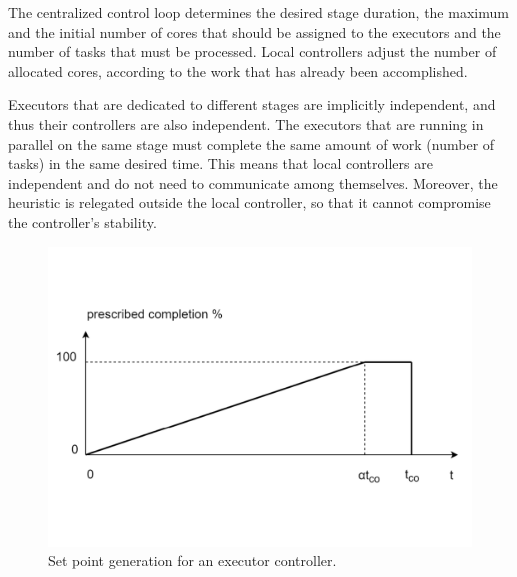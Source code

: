 The centralized control loop determines the desired stage duration, the maximum and the initial number of cores that should be assigned to the executors and the number of tasks that must be processed. Local controllers adjust the number of allocated cores, according to
the work that has already been accomplished.

Executors that are dedicated to different stages are implicitly independent, and thus their controllers are also independent. The executors that are running in parallel on the same stage must complete the same amount of work (number of tasks) in the same desired time.
This means that local controllers are independent and do not need to communicate among themselves. Moreover, the heuristic is relegated outside the local controller, so that it cannot compromise the controller’s stability.
\begin{figure}
	\centering
	\includegraphics[width=\columnwidth]{Images/exec_controller_set_point.pdf}  
	\caption[Set point generation for an executor controller.]{Set point generation for an executor controller.}
	\label{fig:execControllerSetPoint}
\end{figure}

